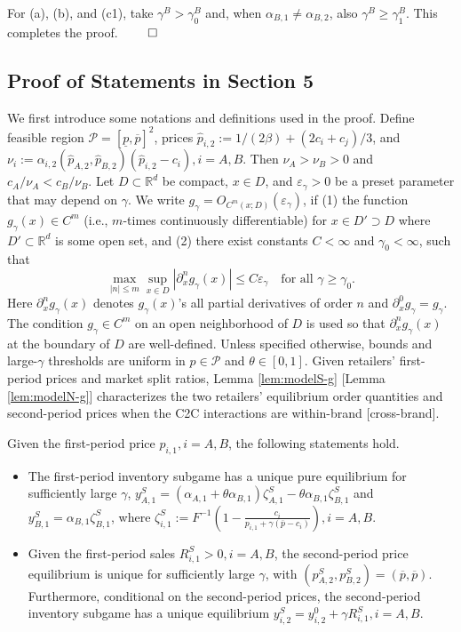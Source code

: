 \documentclass[nonblindrev,copyedit]{informs1}
\begin{document}
\begin{APPENDICES}
For (a), (b), and (c1), take $\gamma^B>\gamma_0^B$ and, when $\alpha_{B,1}\ne\alpha_{B,2}$, also $\gamma^B\geq\gamma_1^B$. This completes the proof.
$\qed$

\subsection{Proof of Statements in Section 5}
We first introduce some notations and definitions used in the proof.
Define feasible region $\mathcal{P} = [\underline{p},\overline{p}]^2$, prices $\widehat p_{i,2} :=1/(2\beta)+(2c_i+c_j)/3$, and $\nu_i :=\alpha_{i,2}(\widehat p_{A,2},\widehat p_{B,2})(\widehat p_{i,2}-c_i), i = A, B$. Then $\nu_A>\nu_B>0$ and $c_A/\nu_A<c_B/\nu_B$. Let $D \subset \mathbb{R}^d$ be compact, $x \in D$, and $\varepsilon_{\gamma} > 0$ be a preset parameter that may depend on $\gamma$. We write $g_\gamma = O_{C^m(x;D)}(\varepsilon_{\gamma})$, if (1) the function $g_\gamma(x)\in C^m$ (i.e., $m$-times continuously differentiable) for $x\in D'\supset D$ where $D'\subset \mathbb{R}^d$ is some open set, and (2) there exist constants $C < \infty$ and $\gamma_0 < \infty$, such that
\[
\max_{|n| \leq m} \sup_{x \in D} \left|\partial_x^n g_\gamma(x)\right| \leq C \varepsilon_\gamma \quad \text{for all } \gamma \geq \gamma_0.
\]
Here $\partial_x^n g_\gamma(x)$ denotes $g_\gamma(x)$'s all partial derivatives of order $n$ and $\partial_x^0 g_{\gamma} = g_{\gamma}$. The condition $g_\gamma\in C^m$ on an open neighborhood of \(D\) is used so that $\partial_x^n g_\gamma(x)$ at the boundary of $D$ are well-defined. Unless specified otherwise, bounds and large-$\gamma$ thresholds are uniform in $p\in\mathcal{P}$ and $\theta\in[0,1]$.
Given retailers' first-period prices and market split ratios, Lemma \ref{lem:modelS-g} [Lemma \ref{lem:modelN-g}] characterizes the two retailers' equilibrium order quantities and second-period prices when the C2C interactions are within-brand [cross-brand].

\begin{lemma} \label{lem:modelS-g}
Given the first-period price $p_{i,1}, i= A, B$, the following statements hold.
    \begin{itemize}
    \item [(a)] The first-period inventory subgame has a unique pure equilibrium for sufficiently large $\gamma$, $y_{A,1}^S=(\alpha_{A,1}+\theta\alpha_{B,1})\zeta_{A,1}^S -\theta\alpha_{B,1}\zeta_{B,1}^S$ and $y_{B,1}^S=\alpha_{B,1}\zeta_{B,1}^S$, where $\zeta^S_{i,1} := F^{-1}(1 - \frac{c_i}{p_{i,1} + \gamma (\overline{p}-c_i)}), i = A, B$.
    \item [(b)] Given the first-period sales $R^S_{i,1}>0, i = A, B$, the second-period price equilibrium is unique for sufficiently large $\gamma$, with $(p^S_{A,2}, p^S_{B,2})=(\overline{p},\overline{p})$. Furthermore, conditional on the second-period prices, the second-period inventory subgame has a unique equilibrium $y_{i,2}^S=y_{i,2}^0+\gamma R_{i,1}^S, i= A, B$.
    \end{itemize}
\end{lemma}


\end{APPENDICES}
\end{document}
